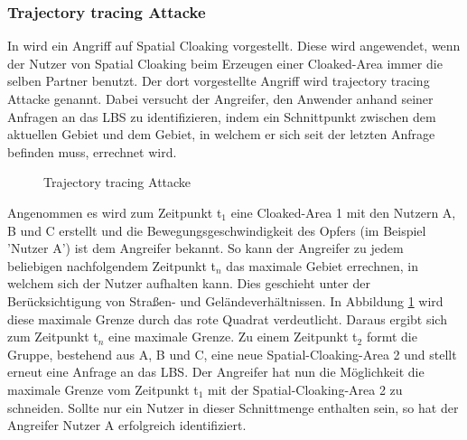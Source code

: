 \subsubsection{Trajectory tracing Attacke} 
In \cite{Chow2011} wird ein Angriff auf Spatial Cloaking vorgestellt. Diese wird angewendet, wenn der Nutzer von Spatial Cloaking beim Erzeugen einer Cloaked-Area immer die selben Partner benutzt. Der dort vorgestellte Angriff wird trajectory tracing Attacke genannt. Dabei versucht der Angreifer, den Anwender anhand seiner Anfragen an das LBS zu identifizieren, indem ein Schnittpunkt zwischen dem aktuellen Gebiet und dem Gebiet, in welchem er sich seit der letzten Anfrage befinden muss, errechnet wird. 
\begin{figure}[!h]
		\centering
		\caption{Trajectory tracing Attacke}
		\label{fig_chow2011_traj-tracing-att}
\end{figure}
Angenommen es wird zum Zeitpunkt t$_{1}$ eine Cloaked-Area 1 mit den Nutzern A, B und C erstellt und die Bewegungsgeschwindigkeit des Opfers (im Beispiel 'Nutzer A') ist dem Angreifer bekannt. So kann der Angreifer zu jedem beliebigen nachfolgendem Zeitpunkt t$_{n}$ das maximale Gebiet errechnen, in welchem sich der Nutzer aufhalten kann. Dies geschieht unter der Berücksichtigung von Straßen- und Geländeverhältnissen. In Abbildung \ref{fig_chow2011_traj-tracing-att} wird diese maximale Grenze durch das rote Quadrat verdeutlicht. Daraus ergibt sich zum Zeitpunkt t$_{n}$ eine maximale Grenze. Zu einem Zeitpunkt t$_{2}$ formt die Gruppe, bestehend aus A, B und C, eine neue Spatial-Cloaking-Area 2 und stellt erneut eine Anfrage an das LBS. Der Angreifer hat nun die Möglichkeit die maximale Grenze vom Zeitpunkt t$_{1}$ mit der Spatial-Cloaking-Area 2 zu schneiden. Sollte nur ein Nutzer in dieser Schnittmenge enthalten sein, so hat der Angreifer Nutzer A erfolgreich identifiziert.

